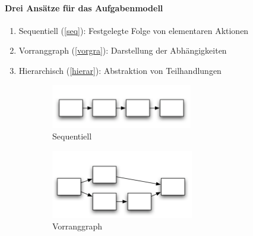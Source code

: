\paragraph*{Drei Ansätze für das Aufgabenmodell}
\begin{enumerate}
\item Sequentiell (\autoref{seq}): Festgelegte Folge von elementaren Aktionen 
\item Vorranggraph (\autoref{vorgra}): Darstellung der Abhängigkeiten
\item Hierarchisch (\autoref{hierar}): Abstraktion von Teilhandlungen
\end{enumerate}
\begin{figure}[h!]
	\centering
	\begin{subfigure}{.25\textwidth}
		\includegraphics[width=\textwidth]{figures/ch02_ans.png}
		\caption{Sequentiell}
		\label{seq}
	\end{subfigure}
	\begin{subfigure}{.25\textwidth}
		\includegraphics[width=\textwidth]{figures/ch02_ans1.png}
		\caption{Vorranggraph}
		\label{vorgra}
	\end{subfigure}
		\begin{subfigure}{.25\textwidth}

\end{subfigure}
\end{figure}

